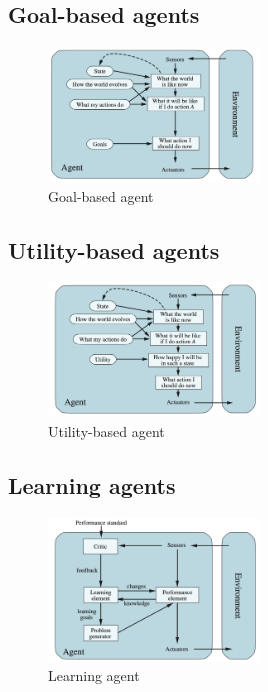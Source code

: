\subsection{Goal-based agents}
\begin{figure}[H]
    \centering
    \includegraphics[width=0.5\textwidth]{img/goal-based-agents.png}
    \caption{Goal-based agent}
    \label{fig:goal-based-agents}
\end{figure}
\subsection{Utility-based agents}
\begin{figure}[H]
    \centering
    \includegraphics[width=0.5\textwidth]{img/utility-based-agents.png}
    \caption{Utility-based agent}
    \label{fig:utility-based-agents}
\end{figure}
\subsection{Learning agents}
\begin{figure}[H]
    \centering
    \includegraphics[width=0.5\textwidth]{img/learning-agents.png}
    \caption{Learning agent}
    \label{fig:learning-agents}
\end{figure}
